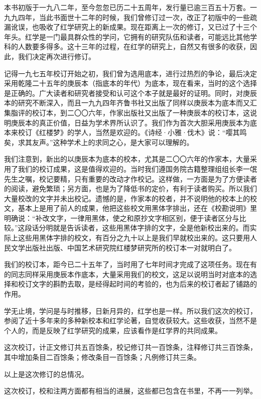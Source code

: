 \par 本书初版于一九八二年，至今忽忽已历二十五周年，发行量已逾三百五十万套。一九九四年，当此书面世十二年的时候，我们曾修订过一次，改正了初版中的一些疏漏讹误，也吸收了红学研究上的新成果。现在距离上一次的修订，又已过了十三个年头。红学是一门最具群众性的学问，它拥有的研究队伍和读者，可能远比其他学科的人数要多得多。这十三年的过程，在红学的研究上，自然又有很多的收获，因此，我们决定再次进行修订。
\par 记得一九七五年校订开始之初，我们曾为选用底本，进行过热烈的争论，最后决定采用乾隆二十五年的庚辰本（指底本的年代）为底本，现在看来，当时的这个选择是正确的。广大读者和研究者接受和认可这个本子就是最好的证明。同时，对庚辰本的研究不断深入，而且一九九四年齐鲁书社又出版了同样以庚辰本为底本而又汇集脂评的校订本，到二〇〇六年，作家出版社又出版了一种庚辰本的校订本，这说明庚辰本的真正价值，日益为学术界所认识了。我们作为首次大胆采用庚辰本为底本来校订《红楼梦》的学人，当然是欢迎的。《诗经·小雅·伐木》说：“嘤其鸣矣，求其友声。”这种学术上的求同之心，是大家可以理解的。
\par 我们注意到，新出的以庚辰本为底本的校本，尤其是二〇〇六年的作家本，大量采用了我们的校订成果，这是值得欢迎的。当时我们遵国务院古籍整理组组长李一氓先生之嘱，校记要精，只有重要的改动才作校记。这样做，一方面是为了方便读者的阅读，避免繁琐；另方面，也是为了降低书的定价，有利于读者购买。所以我们大量校改的文字并未出校记。遗憾的是，作家本的校者，并不说明他的校本上的校文，基本上是用了前人的成果，他把这些校文用黑体字排出，还在《校勘说明》里明确说：“补改文字，一律用黑体，使之和原抄文字相区别，便于读者区分与比较。”这段话分明就是告诉读者，这些用黑体字排的文字，全是他新校出来的。而实际上这些用黑体字排的校文，有百分之九十以上是我们早就校出来的。这只要用人民文学出版社出版、中国艺术研究院红楼梦研究所的校订本一对就明白了。
\par 我们的校订本，距今已二十五年了，当时用了七年时间才完成了这项任务。现在有的同志同样采用庚辰本作底本，大量采用我们的校文，这足以说明当时对底本的选择和校订文字的斟酌去取，是经得起时间的考验的，也为后来的校订者起了铺路的作用。
\par 学无止境，学问是与时推移，日新月异的，红学也是一样。所以我们这次的校订，参阅了近十多年来的多种新校本和红学论著，自觉收获较大。这些收获，当然不是个人的，而是反映了红学研究的成果，应该看作是红学界的共同成果。
\par 这次校订，计正文修订共五百馀条，校记修订共一百馀条，注释修订共三百馀条，其中增加条目二百馀条；修改条目一百馀条；凡例修订共三条。
\par 以上是这次修订的总情况。
\par 这次校订，校和注两方面都有相当的进展，这些都已包含在书里，不再一一列举。
